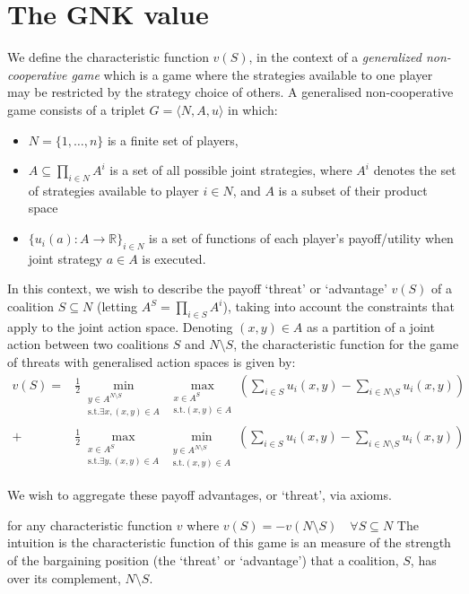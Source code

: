 \documentclass[
10pt, %
a4paper, %
oneside, %
headinclude,footinclude, %
BCOR5mm, %
]{scrartcl}
\begin{document}
\section{The GNK value}
We define the characteristic function $v(S)$, in the context of a \textit{generalized non-cooperative game} which is a game where the strategies available to one player may be restricted by the strategy choice of others.
A generalised non-cooperative game consists of a triplet $G = \langle N,A,u \rangle$ in which:
\begin{itemize}
\item	$N=\{1,\dots,n\}$ is a finite set of players,
\item	$A\subseteq \prod_{i\in N}A^i$ is a set of all possible joint strategies, where $A^i$ denotes the set of strategies available to player $i\in N$, and $A$ is a subset of their product space
\item	$\{u_i(a) : A\rightarrow \mathbb{R}\}_{i\in N}$ is a set of functions of each player's payoff/utility when joint strategy $a\in A$ is executed.
\end{itemize}

In this context, we wish to describe the payoff `threat' or `advantage' $v(S)$ of a coalition $S\subseteq N$ (letting $A^S=\prod_{i\in S}A^i$), taking into account the constraints that apply to the joint action space.
Denoting $(x,y)\in A$ as a partition of a joint action between two coalitions $S$ and $N\setminus S$, 
the characteristic function for the game of threats with generalised action spaces is given by:
\begin{align}
\label{knvalue1}
v(S) = &
\frac{1}{2}\min_{\substack{y\in A^{N\setminus S} \\ \text{s.t.}\exists x,(x,y)\in A}} 
\max_{\substack{x\in A^S \\ \text{s.t.}(x,y)\in A}}
	\left(\sum_{i\in S} u_i(x,y) - \sum_{i\in N\setminus S}u_i(x,y)\right)\nonumber\\
+&
\frac{1}{2}\max_{\substack{x\in A^S \\ \text{s.t.}\exists y,(x,y)\in A}}
\min_{\substack{y\in A^{N\setminus S} \\ \text{s.t.}(x,y)\in A}}
	\left(\sum_{i\in S} u_i(x,y) - \sum_{i\in N\setminus S} u_i(x,y) \right)
\end{align}

We wish to aggregate these payoff advantages, or `threat', via axioms.

for any characteristic function $v$ where $v(S)=-v(N\setminus S) \label{myeq2} \quad \forall S\subseteq N$
The intuition is the characteristic function of this game is an measure of the strength of the bargaining position (the `threat' or `advantage') that a coalition, $S$, has over its complement, $N\setminus S$.
\end{document}
